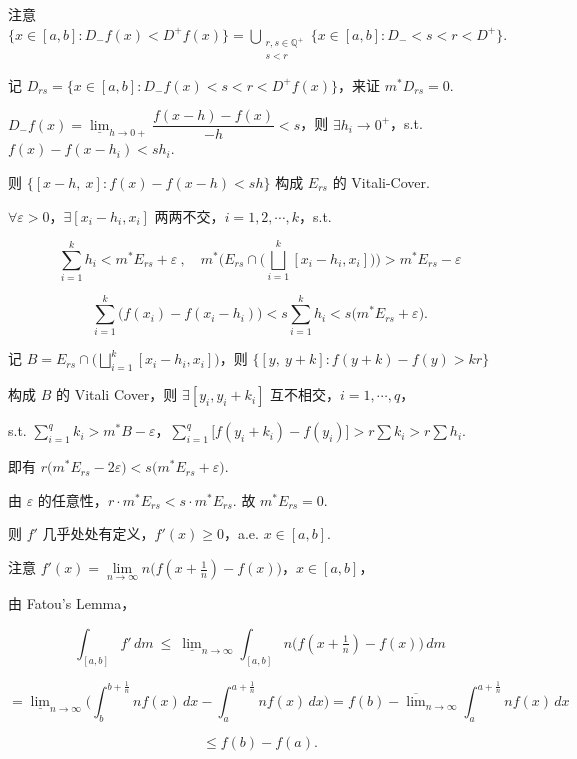 \documentclass[11pt]{ctexart}
\theoremstyle{definition}
\begin{document}
注意 $\{x \in [a,b] : D_- f(x) < D^+ f(x)\} = \bigcup\limits_{\substack{r, s \in \mathbb{Q}^+ \\ s < r}} \Big\{x \in [a,b] : D_- < s < r < D^+\Big\}$.

记 $D_{rs} = \{x \in [a,b] : D_- f(x) < s < r < D^+ f(x)\}$，来证 $m^*D_{rs} = 0$.

$D_- f(x) = \underline{\lim}_{h \to 0+} \dfrac{f(x-h) - f(x)}{-h} < s$，则 $\exists h_i \to 0^+$，s.t. $f(x) - f(x - h_i) < s h_i$.

则 $\{[x-h,\ x] : f(x) - f(x-h) < sh\}$ 构成 $E_{rs}$ 的 Vitali-Cover.

$\forall \varepsilon > 0$，$\exists [x_i - h_i, x_i]$ 两两不交，$i = 1, 2, \cdots, k$，s.t.

\[
\sum_{i=1}^{k} h_i < m^*E_{rs} + \varepsilon \ ,\quad m^*\Big(E_{rs} \cap \big(\bigsqcup_{i=1}^{k} [x_i - h_i, x_i]\big)\Big) > m^*E_{rs} - \varepsilon
\]

\[
\sum_{i=1}^{k} \big(f(x_i) - f(x_i - h_i)\big) < s \sum_{i=1}^{k} h_i < s\big(m^*E_{rs} + \varepsilon\big).
\]

记 $B = E_{rs} \cap \big(\bigsqcup\limits_{i=1}^{k} [x_i - h_i, x_i]\big)$，则 $\{[y,\ y+k] : f(y+k) - f(y) > kr\}$

构成 $B$ 的 Vitali Cover，则 $\exists [y_i, y_i + k_i]$ 互不相交，$i = 1, \cdots, q$，

s.t. $\displaystyle\sum_{i=1}^{q} k_i > m^*B - \varepsilon$，$\displaystyle\sum_{i=1}^{q} \big[f(y_i + k_i) - f(y_i)\big] > r \sum k_i > r \sum h_i$.

即有 $r\big(m^*E_{rs} - 2\varepsilon\big) < s\big(m^*E_{rs} + \varepsilon\big)$.

由 $\varepsilon$ 的任意性，$r \cdot m^*E_{rs} < s \cdot m^*E_{rs}$. 故 $m^*E_{rs} = 0$.

则 $f'$ 几乎处处有定义，$f'(x) \geq 0$，a.e. $x \in [a,b]$.

注意 $f'(x) = \lim\limits_{n \to \infty} n\big(f(x + \tfrac{1}{n}) - f(x)\big)$，$x \in [a,b]$，

由 Fatou's Lemma，

\[
\int_{[a,b]} f' \, dm \ \leq\ \underline{\lim}_{n \to \infty} \int_{[a,b]} n\big(f(x + \tfrac{1}{n}) - f(x)\big) \, dm
\]

\[
= \underline{\lim}_{n \to \infty} \Big( \int_b^{b + \frac{1}{n}} n f(x)\, dx - \int_a^{a + \frac{1}{n}} n f(x)\, dx \Big) = f(b) - \overline{\lim}_{n \to \infty} \int_a^{a + \frac{1}{n}} n f(x)\, dx
\]

\[
\leq f(b) - f(a).
\]
\end{document}
